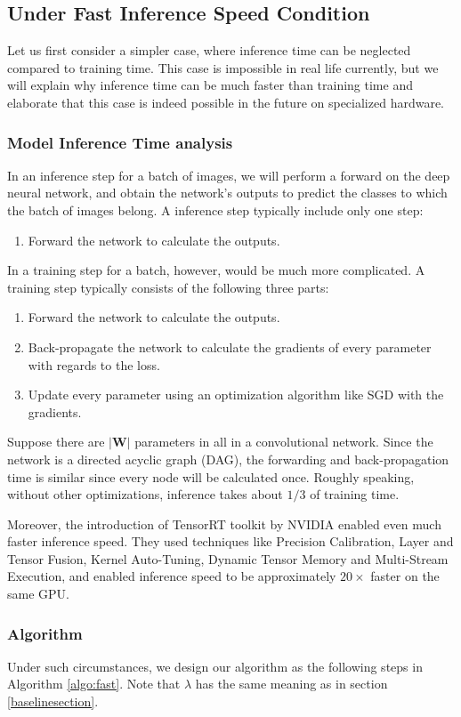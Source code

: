 \subsection{Under Fast Inference Speed Condition}
Let us first consider a simpler case, where inference time can be neglected compared to training time. This case is impossible in real life currently, but we will explain why inference time can be much faster than training time and elaborate that this case is indeed possible in the future on specialized hardware.
\subsubsection{Model Inference Time analysis}
In an inference step for a batch of images, we will perform a forward on the deep neural network, and obtain the network's outputs to predict the classes to which the batch of images belong. A inference step typically include only one step:
\begin{enumerate}
	\item  Forward the network to calculate the outputs.
\end{enumerate}

In a training step for a batch, however, would be much more complicated. A training step typically consists of the following three parts:
\begin{enumerate}
	\item  Forward the network to calculate the outputs.
	\item Back-propagate the network to calculate the gradients of every parameter with regards to the loss.
	\item Update every parameter using an optimization algorithm like SGD with the gradients.
\end{enumerate}
Suppose there are $|\mathbf{W}|$ parameters in all in a convolutional network. Since the network is a directed acyclic graph (DAG), the forwarding and back-propagation time is similar since every node will be calculated once. Roughly speaking, without other optimizations, inference takes about $1/3$ of training time.

Moreover, the introduction of TensorRT toolkit by NVIDIA enabled even much faster inference speed. They used techniques like Precision Calibration, Layer and Tensor Fusion, Kernel Auto-Tuning, Dynamic Tensor Memory and Multi-Stream Execution, and enabled inference speed to be approximately $20\times$ faster on the same GPU.

\subsubsection{Algorithm}
Under such circumstances, we design our algorithm as the following steps in Algorithm \ref{algo:fast}. Note that $\lambda$ has the same meaning as in section \ref{baselinesection}.

